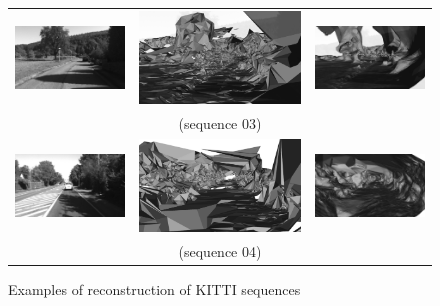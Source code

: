 \begin{figure}[tp]
\begin{tabular}{ccc}
\includegraphics[height=0.2\textwidth]{./img/ch-incr-dens/03aorig00}&
\includegraphics[height=0.2\textwidth]{./img/ch-incr-dens/03ainit00}&
\includegraphics[height=0.2\textwidth]{./img/ch-incr-dens/03aref00}\\
&(sequence 03)&\\
\includegraphics[height=0.2\textwidth]{./img/ch-incr-dens/04aorig00}&
\includegraphics[height=0.2\textwidth]{./img/ch-incr-dens/04ainit00}&
\includegraphics[height=0.2\textwidth]{./img/ch-incr-dens/04aref00}\\
&(sequence 04)&\\
\end{tabular}
\caption{Examples of reconstruction of KITTI sequences }
\label{fig:kitti}
\end{figure}



